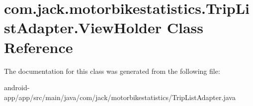 \hypertarget{classcom_1_1jack_1_1motorbikestatistics_1_1_trip_list_adapter_1_1_view_holder}{}\section{com.\+jack.\+motorbikestatistics.\+Trip\+List\+Adapter.\+View\+Holder Class Reference}
\label{classcom_1_1jack_1_1motorbikestatistics_1_1_trip_list_adapter_1_1_view_holder}


The documentation for this class was generated from the following file\+:\begin{DoxyCompactItemize}
\item 
android-\/app/app/src/main/java/com/jack/motorbikestatistics/Trip\+List\+Adapter.\+java\end{DoxyCompactItemize}
